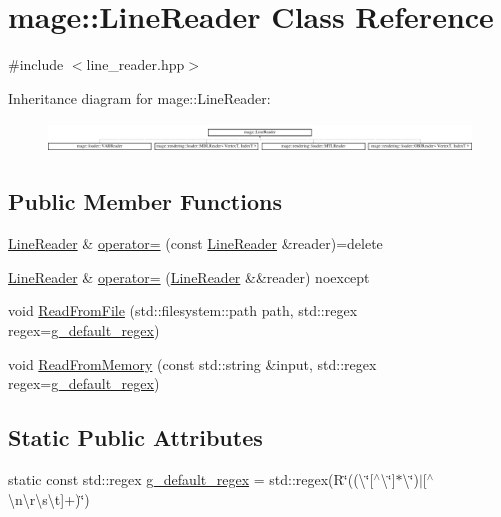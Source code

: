 \hypertarget{classmage_1_1_line_reader}{}\section{mage\+:\+:Line\+Reader Class Reference}
\label{classmage_1_1_line_reader}


{\ttfamily \#include $<$line\+\_\+reader.\+hpp$>$}

Inheritance diagram for mage\+:\+:Line\+Reader\+:\begin{figure}[H]
\begin{center}
\leavevmode
\includegraphics[height=0.821114cm]{classmage_1_1_line_reader}
\end{center}
\end{figure}
\subsection*{Public Member Functions}
\begin{DoxyCompactItemize}
\item 
\mbox{\hyperlink{classmage_1_1_line_reader}{Line\+Reader}} \& \mbox{\hyperlink{classmage_1_1_line_reader_a2247078d0b5602f9a9a6b74019832faf}{operator=}} (const \mbox{\hyperlink{classmage_1_1_line_reader}{Line\+Reader}} \&reader)=delete
\item 
\mbox{\hyperlink{classmage_1_1_line_reader}{Line\+Reader}} \& \mbox{\hyperlink{classmage_1_1_line_reader_a3ba691cb32a1ab5dcbe75498068c1b86}{operator=}} (\mbox{\hyperlink{classmage_1_1_line_reader}{Line\+Reader}} \&\&reader) noexcept
\item 
void \mbox{\hyperlink{classmage_1_1_line_reader_ac819910b2ad9cf9751fa223d4f90ada0}{Read\+From\+File}} (std\+::filesystem\+::path path, std\+::regex regex=\mbox{\hyperlink{classmage_1_1_line_reader_a6b21fad06278a64bbdece198844a8cfa}{g\+\_\+default\+\_\+regex}})
\item 
void \mbox{\hyperlink{classmage_1_1_line_reader_adc2bf81611774d4a11da47812fcc0f6a}{Read\+From\+Memory}} (const std\+::string \&input, std\+::regex regex=\mbox{\hyperlink{classmage_1_1_line_reader_a6b21fad06278a64bbdece198844a8cfa}{g\+\_\+default\+\_\+regex}})
\end{DoxyCompactItemize}
\subsection*{Static Public Attributes}
\begin{DoxyCompactItemize}
\item 
static const std\+::regex \mbox{\hyperlink{classmage_1_1_line_reader_a6b21fad06278a64bbdece198844a8cfa}{g\+\_\+default\+\_\+regex}} = std\+::regex(R\char`\"{}((\textbackslash{}\char`\"{}\mbox{[}$^\wedge$\textbackslash{}\char`\"{}\mbox{]}$\ast$\textbackslash{}\char`\"{})$\vert$\mbox{[}$^\wedge$\textbackslash{}n\textbackslash{}r\textbackslash{}s\textbackslash{}t\mbox{]}+)\char`\"{})
\end{DoxyCompactItemize}
